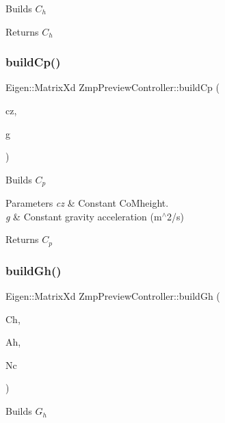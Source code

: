 Builds $C_h$

\begin{DoxyReturn}{Returns}
$C_h$ 
\end{DoxyReturn}
\hypertarget{classZmpPreviewController_a716fdc040e5eaf9f6fe00c652f205d73}{}\label{classZmpPreviewController_a716fdc040e5eaf9f6fe00c652f205d73} 
\subsubsection{\texorpdfstring{build\+Cp()}{buildCp()}}
{\footnotesize\ttfamily Eigen\+::\+Matrix\+Xd Zmp\+Preview\+Controller\+::build\+Cp (\begin{DoxyParamCaption}\item[{const double}]{cz,  }\item[{const double}]{g }\end{DoxyParamCaption})}

Builds $C_p$


\begin{DoxyParams}{Parameters}
{\em cz} & Constant Co\+Mheight. \\
\hline
{\em g} & Constant gravity acceleration (m$^\wedge$2/s)\\
\hline
\end{DoxyParams}
\begin{DoxyReturn}{Returns}
$C_p$ 
\end{DoxyReturn}
\hypertarget{classZmpPreviewController_ac0e73fabb20f31dbbb85ce61414dbb87}{}\label{classZmpPreviewController_ac0e73fabb20f31dbbb85ce61414dbb87} 
\subsubsection{\texorpdfstring{build\+Gh()}{buildGh()}}
{\footnotesize\ttfamily Eigen\+::\+Matrix\+Xd Zmp\+Preview\+Controller\+::build\+Gh (\begin{DoxyParamCaption}\item[{Eigen\+::\+Matrix\+Xd}]{Ch,  }\item[{Eigen\+::\+Matrix\+Xd}]{Ah,  }\item[{const int}]{Nc }\end{DoxyParamCaption})}

Builds $G_h$


